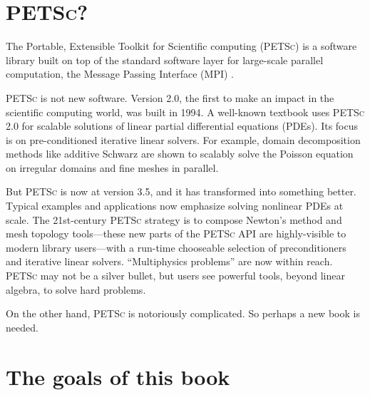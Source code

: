 \documentclass{tufte-book}
\newcommand{\PETSc}{\textsc{PETSc}\xspace}
\begin{document}
\section{\PETSc?}

The Portable, Extensible Toolkit for Scientific computing (\PETSc{}) \citep{petsc-user-ref} is a software library built on top of the standard software layer for large-scale parallel computation, the Message Passing Interface (MPI) \citep{Groppetal1999}.

\PETSc is not new software.  Version 2.0, the first to make an impact in the scientific computing world, was built in 1994.  A well-known textbook \citet{Smithetal1996} uses \PETSc 2.0 for scalable solutions of linear partial differential equations (PDEs).  Its focus is on pre-conditioned iterative linear solvers.  For example, domain decomposition methods like additive Schwarz are shown to scalably solve the Poisson equation on irregular domains and fine meshes in parallel.

But \PETSc is now at version 3.5, and it has transformed into something better.  Typical examples and applications now emphasize solving nonlinear PDEs at scale.  The 21st-century \PETSc strategy is to compose Newton's method and mesh topology tools---these new parts of the \PETSc API are highly-visible to modern library users---with a run-time chooseable selection of preconditioners and iterative linear solvers.  ``Multiphysics problems'' are now within reach.  \PETSc may not be a silver bullet, but users see powerful tools, beyond linear algebra, to solve hard problems.

On the other hand, \PETSc is notoriously complicated.  So perhaps a new book is needed.

\section{The goals of this book}
\end{document}
